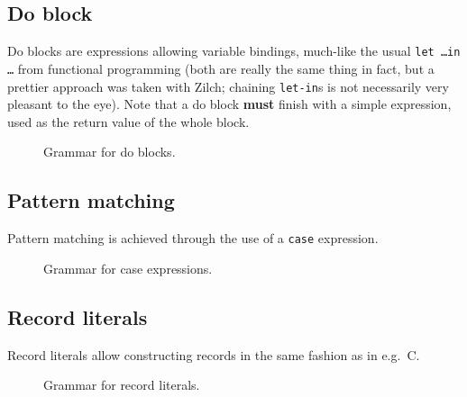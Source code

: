 \subsection{Do block}\label{subsec:zilch-grammar-expressions-do}

Do blocks are expressions allowing variable bindings, much-like the usual \texttt{let \ldots in \ldots} from functional programming (both are really the same thing in fact, but a prettier approach was taken with Zilch; chaining \texttt{let-in}s is not necessarily very pleasant to the eye).
Note that a do block \textbf{must} finish with a simple expression, used as the return value of the whole block.

\begin{figure}[H]
  \centering


  \caption{Grammar for do blocks.}
  \label{fig:zilch-gramma-expressions-do-grammar}
\end{figure}

\subsection{Pattern matching}\label{subsec:zilch-grammar-expressions-case}

Pattern matching is achieved through the use of a \texttt{case} expression.

\begin{figure}[H]
  \centering


  \caption{Grammar for case expressions.}
  \label{fig:zilch-gramma-expressions-case-grammar}
\end{figure}

\subsection{Record literals}\label{subsec:zilch-grammar-expressions-record}

Record literals allow constructing records in the same fashion as in e.g.\ C.

\begin{figure}[H]
  \centering


  \caption{Grammar for record literals.}
  \label{fig:zilch-gramma-expressions-record-grammar}
\end{figure}

